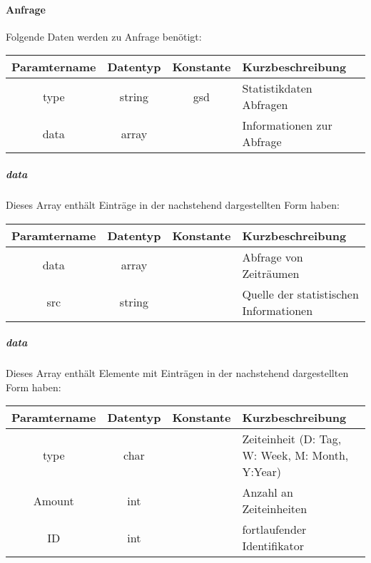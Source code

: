 \paragraph{Anfrage}Folgende Daten werden zu Anfrage benötigt:
\begin{table}[H]
	\begin{tabular}{|c|c|c|p{6.5cm}|}
		\hline
		\textbf{Paramtername} & \textbf{Datentyp} & \textbf{Konstante} & \textbf{Kurzbeschreibung}                                                                                               \\ \hline
		type                & string            & gsd                & Statistikdaten Abfragen\\ \hline
		data                & array             &                    & Informationen zur Abfrage \\ \hline
	\end{tabular}
\end{table}
\subparagraph{data}Dieses Array enthält Einträge in der nachstehend dargestellten Form haben:
\begin{table}[H]
	\begin{tabular}{|c|c|c|p{6.5cm}|}
		\hline
		\textbf{Paramtername} & \textbf{Datentyp} & \textbf{Konstante} & \textbf{Kurzbeschreibung}    \\ \hline
		data                   & array           &                 & Abfrage von Zeiträumen \\ \hline
		src                    & string          &                 & Quelle der statistischen Informationen \\ \hline
	\end{tabular}
\end{table}
\subparagraph{data}Dieses Array enthält Elemente mit Einträgen in der nachstehend dargestellten Form haben:
\begin{table}[H]
	\begin{tabular}{|c|c|c|p{6.5cm}|}
		\hline
		\textbf{Paramtername} & \textbf{Datentyp} & \textbf{Konstante} & \textbf{Kurzbeschreibung}    \\ \hline
		type                   & char            &                 & Zeiteinheit (D: Tag, W: Week, M: Month, Y:Year) \\ \hline
		Amount                 & int             &                 & Anzahl an Zeiteinheiten \\ \hline
		ID                     & int             &                 & fortlaufender Identifikator \\ \hline
	\end{tabular}
\end{table}
